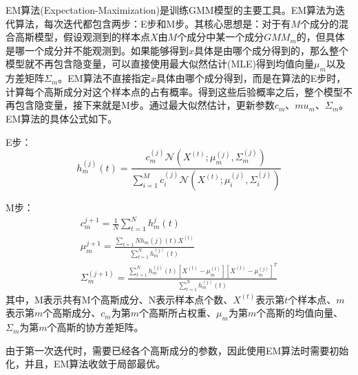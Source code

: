 EM算法(Expectation-Maximization)是训练GMM模型的主要工具。EM算法为迭代算法，每次迭代都包含两步：E步和M步。其核心思想是：对于有$M$个成分的混合高斯模型，假设观测到的样本点$X$由$M$个成分中某一个成分$GMM_m$的，但具体是哪一个成分并不能观测到。如果能够得到$x$具体是由哪个成分得到的，那么整个模型就不再包含隐变量，可以直接使用最大似然估计(MLE)得到均值向量$\mu_m$以及方差矩阵$\Sigma_m$。EM算法不直接指定$x$具体由哪个成分得到，而是在算法的E步时，计算每个高斯成分对这个样本点的占有概率。得到这些后验概率之后，整个模型不再包含隐变量，接下来就是M步。通过最大似然估计，更新参数$c_m$、$mu_m$、$\Sigma_m$。EM算法的具体公式如下。

E步：
\begin{equation}
  h_m^{(j)}(t) = \frac{c_m^{(j)}\mathcal{N}(X^{(t)};\mu_m^{(j)},\Sigma_m^{(j)})}{\sum_{i=1}^M c_i^{(j)}\mathcal{N}(X^{(t)};\mu_i^{(j)},\Sigma_i^{(j)})}
\end{equation}

M步：
\begin{eqnarray}
  c_m^{j+1}=\frac{1}{N}\sum_{t=1}^N h_m^{j}(t) \\
  \mu_m^{j+1}=\frac{\sum_{t=1}{N} h_m{(j)}(t)X^{(t)}}{\sum_{t=1}^{N} h_m^{(j)}(t)} \\
  \Sigma_m^{(j+1)}=\frac{\sum_{t=1}^{N} h_m^{(j)}(t)[X^{(t)}-\mu_m^{(t)}][X^{(t)}-\mu_m^{(j)}]^T}{\sum_{t=1}^{N} h_m^{(j)}(t)}
\end{eqnarray}
其中，M表示共有M个高斯成分、N表示样本点个数、$X^{(t)}$表示第$t$个样本点、$m$表示第$m$个高斯成分、$c_m$为第$m$个高斯所占权重、$\mu_m$为第$m$个高斯的均值向量、$\Sigma_m$为第$m$个高斯的协方差矩阵。

由于第一次迭代时，需要已经各个高斯成分的参数，因此使用EM算法时需要初始化，并且，EM算法收敛于局部最优。
